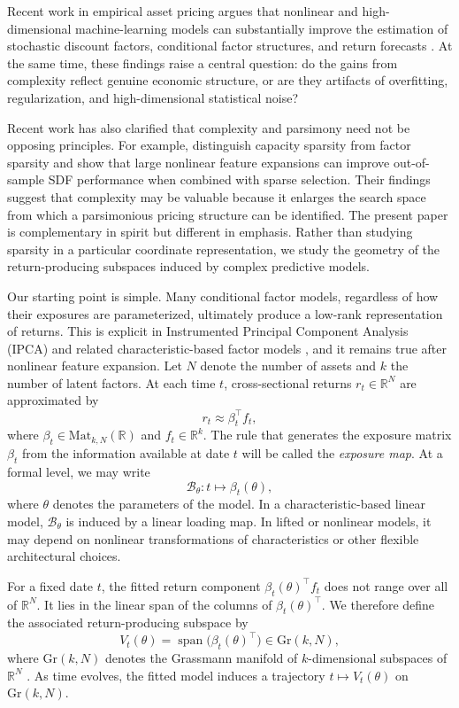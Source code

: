 \documentclass[11pt,letterpaper]{article}
\newcommand{\gr}{\mathrm{Gr}}
\newcommand{\bR}{\mathbb{R}}
\newcommand{\cB}{\mathcal{B}}
\begin{document}
Recent work in empirical asset pricing argues that nonlinear and high-dimensional machine-learning models can substantially improve the estimation of stochastic discount factors, conditional factor structures, and return forecasts \cite{GKX20, KMZ24}. At the same time, these findings raise a central question: do the gains from complexity reflect genuine economic structure, or are they artifacts of overfitting, regularization, and high-dimensional statistical noise?

Recent work has also clarified that complexity and parsimony need not be opposing principles. For example, \cite{AL26} distinguish capacity sparsity from factor sparsity and show that large nonlinear feature expansions can improve out-of-sample SDF performance when combined with sparse selection. Their findings suggest that complexity may be valuable because it enlarges the search space from which a parsimonious pricing structure can be identified. The present paper is complementary in spirit but different in emphasis. Rather than studying sparsity in a particular coordinate representation, we study the geometry of the return-producing subspaces induced by complex predictive models.

Our starting point is simple. Many conditional factor models, regardless of how their exposures are parameterized, ultimately produce a low-rank representation of returns. This is explicit in Instrumented Principal Component Analysis (IPCA) and related characteristic-based factor models \cite{KPS19}, and it remains true after nonlinear feature expansion. Let $N$ denote the number of assets and $k$ the number of latent factors. At each time $t$, cross-sectional returns $r_t\in\bR^N$ are approximated by
\begin{equation}
r_t \approx \beta_t^\top f_t,
\end{equation}
where $\beta_t\in\mathrm{Mat}_{k,N}(\bR)$ and $f_t\in\bR^k$. The rule that generates the exposure matrix $\beta_t$ from the information available at date $t$ will be called the \emph{exposure map}. At a formal level, we may write
\begin{equation}
\cB_\theta : t \mapsto \beta_t(\theta),
\end{equation}
where $\theta$ denotes the parameters of the model. In a characteristic-based linear model, $\cB_\theta$ is induced by a linear loading map. In lifted or nonlinear models, it may depend on nonlinear transformations of characteristics or other flexible architectural choices.

For a fixed date $t$, the fitted return component $\beta_t(\theta)^\top f_t$ does not range over all of $\bR^N$. It lies in the linear span of the columns of $\beta_t(\theta)^\top$. We therefore define the associated return-producing subspace by
\begin{equation*}
V_t(\theta) = \operatorname{span}\bigl(\beta_t(\theta)^\top\bigr) \in \gr(k,N),
\end{equation*}
where $\gr(k,N)$ denotes the Grassmann manifold of $k$-dimensional subspaces of $\bR^N$ \cite{AMS08, B23, BZA24}. As time evolves, the fitted model induces a trajectory
$t \mapsto V_t(\theta)$ on $\gr(k,N)$.
\end{document}
